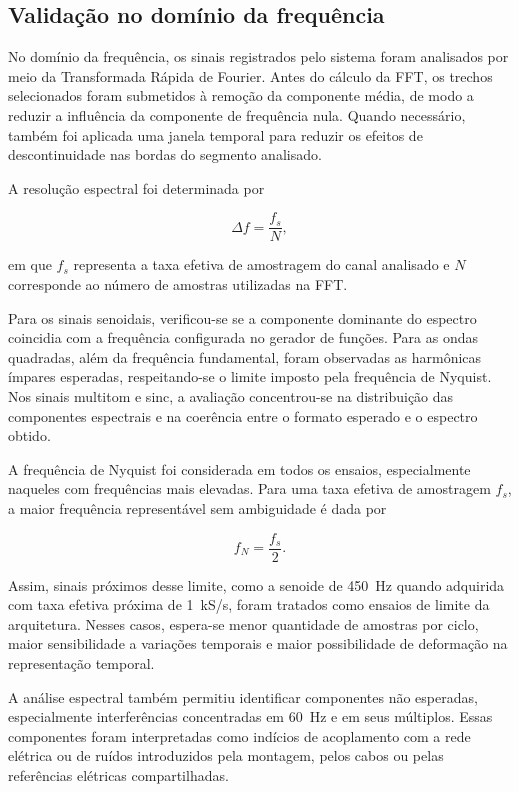 \documentclass[a4paper,12pt]{fcte}
\begin{document}
\subsection{Validação no domínio da frequência}
\label{subsec:validacao_frequencia}

No domínio da frequência, os sinais registrados pelo sistema foram analisados por meio da Transformada Rápida de Fourier. Antes do cálculo da FFT, os trechos selecionados foram submetidos à remoção da componente média, de modo a reduzir a influência da componente de frequência nula. Quando necessário, também foi aplicada uma janela temporal para reduzir os efeitos de descontinuidade nas bordas do segmento analisado.

A resolução espectral foi determinada por

\begin{equation}
    \Delta f = \frac{f_s}{N},
    \label{eq:resolucao_espectral}
\end{equation}

\noindent
em que $f_s$ representa a taxa efetiva de amostragem do canal analisado e $N$ corresponde ao número de amostras utilizadas na FFT.

Para os sinais senoidais, verificou-se se a componente dominante do espectro coincidia com a frequência configurada no gerador de funções. Para as ondas quadradas, além da frequência fundamental, foram observadas as harmônicas ímpares esperadas, respeitando-se o limite imposto pela frequência de Nyquist. Nos sinais multitom e sinc, a avaliação concentrou-se na distribuição das componentes espectrais e na coerência entre o formato esperado e o espectro obtido.

A frequência de Nyquist foi considerada em todos os ensaios, especialmente naqueles com frequências mais elevadas. Para uma taxa efetiva de amostragem $f_s$, a maior frequência representável sem ambiguidade é dada por

\begin{equation}
    f_N = \frac{f_s}{2}.
    \label{eq:nyquist_validacao}
\end{equation}

\noindent
Assim, sinais próximos desse limite, como a senoide de 450~Hz quando adquirida com taxa efetiva próxima de 1~kS/s, foram tratados como ensaios de limite da arquitetura. Nesses casos, espera-se menor quantidade de amostras por ciclo, maior sensibilidade a variações temporais e maior possibilidade de deformação na representação temporal.

A análise espectral também permitiu identificar componentes não esperadas, especialmente interferências concentradas em 60~Hz e em seus múltiplos. Essas componentes foram interpretadas como indícios de acoplamento com a rede elétrica ou de ruídos introduzidos pela montagem, pelos cabos ou pelas referências elétricas compartilhadas.
\end{document}
